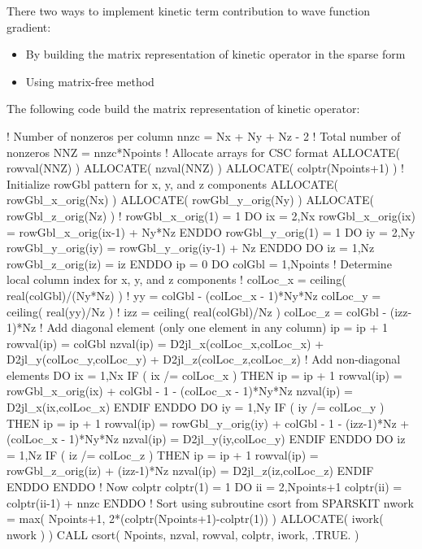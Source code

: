 There two ways to implement kinetic term contribution to wave function
gradient:
\begin{itemize}
\item By building the matrix representation of kinetic operator in the
sparse form
\item Using matrix-free method
\end{itemize}

The following code build the matrix representation of kinetic operator:
\begin{fortrancode}
! Number of nonzeros per column
nnzc = Nx + Ny + Nz - 2
! Total number of nonzeros
NNZ  = nnzc*Npoints
! Allocate arrays for CSC format
ALLOCATE( rowval(NNZ) )
ALLOCATE( nzval(NNZ) )
ALLOCATE( colptr(Npoints+1) )
! Initialize rowGbl pattern for x, y, and z components
ALLOCATE( rowGbl_x_orig(Nx) )
ALLOCATE( rowGbl_y_orig(Ny) )
ALLOCATE( rowGbl_z_orig(Nz) )
!
rowGbl_x_orig(1) = 1
DO ix = 2,Nx
  rowGbl_x_orig(ix) = rowGbl_x_orig(ix-1) + Ny*Nz
ENDDO 
rowGbl_y_orig(1) = 1
DO iy = 2,Ny
  rowGbl_y_orig(iy) = rowGbl_y_orig(iy-1) + Nz
ENDDO 
DO iz = 1,Nz
  rowGbl_z_orig(iz) = iz
ENDDO 
ip = 0
DO colGbl = 1,Npoints
  ! Determine local column index for x, y, and z components
  !
  colLoc_x = ceiling( real(colGbl)/(Ny*Nz) )
  !
  yy = colGbl - (colLoc_x - 1)*Ny*Nz
  colLoc_y = ceiling( real(yy)/Nz )
  !
  izz = ceiling( real(colGbl)/Nz )
  colLoc_z = colGbl - (izz-1)*Nz
  ! Add diagonal element (only one element in any column)
  ip = ip + 1
  rowval(ip) = colGbl
  nzval(ip) = D2jl_x(colLoc_x,colLoc_x) + D2jl_y(colLoc_y,colLoc_y) + D2jl_z(colLoc_z,colLoc_z)
  ! Add non-diagonal elements
  DO ix = 1,Nx
    IF ( ix /= colLoc_x ) THEN 
      ip = ip + 1
      rowval(ip) = rowGbl_x_orig(ix) + colGbl - 1 - (colLoc_x - 1)*Ny*Nz
      nzval(ip) = D2jl_x(ix,colLoc_x)
    ENDIF 
  ENDDO 
  DO iy = 1,Ny
    IF ( iy /= colLoc_y ) THEN 
      ip = ip + 1
      rowval(ip) = rowGbl_y_orig(iy) + colGbl - 1 - (izz-1)*Nz + (colLoc_x - 1)*Ny*Nz
      nzval(ip) = D2jl_y(iy,colLoc_y)
    ENDIF 
  ENDDO 
  DO iz = 1,Nz
    IF ( iz /= colLoc_z ) THEN 
      ip = ip + 1
      rowval(ip) = rowGbl_z_orig(iz) + (izz-1)*Nz
      nzval(ip) = D2jl_z(iz,colLoc_z)
    ENDIF 
  ENDDO 
ENDDO 
! Now colptr
colptr(1) = 1
DO ii = 2,Npoints+1
  colptr(ii) = colptr(ii-1) + nnzc
ENDDO 
! Sort using subroutine csort from SPARSKIT
nwork = max( Npoints+1, 2*(colptr(Npoints+1)-colptr(1)) )
ALLOCATE( iwork( nwork ) )
CALL csort( Npoints, nzval, rowval, colptr, iwork, .TRUE. )
\end{fortrancode}


